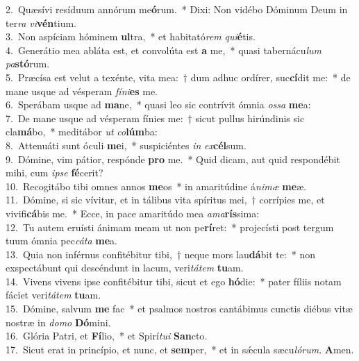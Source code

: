 {2.~}Quæsívi resíduum annórum me\textbf{ó}rum.~* Dixi: Non vidébo Dóminum Deum in ter\textit{ra} \textit{vi}\textbf{vén}tium.\\
{3.~}Non aspíciam hóminem \textbf{ul}tra,~* et habitató\textit{rem} \textit{qui}\textbf{é}tis.\\
{4.~}Generátio mea abláta est, et convolúta est \textbf{a} me,~* quasi tabernácu\textit{lum} \textit{pa}\textbf{stó}rum.\\
{5.~}Præcísa est velut a texénte, vita mea:~† dum adhuc ordírer, suc\textbf{cí}dit me:~* de mane usque ad vésperam \textit{fí}\textit{ni}\textbf{es} me.\\
{6.~}Sperábam usque ad \textbf{ma}ne,~* quasi leo sic contrívit ómnia \textit{os}\textit{sa} \textbf{me}a:\\
{7.~}De mane usque ad vésperam fínies me:~† sicut pullus hirúndinis sic cla\textbf{má}bo,~* meditábor \textit{ut} \textit{co}\textbf{lúm}ba:\\
{8.~}Attenuáti sunt óculi \textbf{me}i,~* suspiciéntes \textit{in} \textit{ex}\textbf{cél}sum.\\
{9.~}Dómine, vim pátior, respónde \textbf{pro} me.~* Quid dicam, aut quid respondébit mihi, cum \textit{i}\textit{pse} \textbf{fé}cerit?\\
{10.~}Recogitábo tibi omnes annos \textbf{me}os~* in amaritúdine á\textit{ni}\textit{mæ} \textbf{me}æ.\\
{11.~}Dómine, si sic vívitur, et in tálibus vita spíritus mei,~† corrípies me, et vivifi\textbf{cá}bis me.~* Ecce, in pace amaritúdo mea \textit{a}\textit{ma}\textbf{rís}sima:\\
{12.~}Tu autem eruísti ánimam meam ut non pe\textbf{rí}ret:~* projecísti post tergum tuum ómnia pec\textit{cá}\textit{ta} \textbf{me}a.\\
{13.~}Quia non inférnus confitébitur tibi,~† neque mors lau\textbf{dá}bit te:~* non exspectábunt qui descéndunt in lacum, veri\textit{tá}\textit{tem} \textbf{tu}am.\\
{14.~}Vivens vivens ipse confitébitur tibi, sicut et ego \textbf{hó}die:~* pater fíliis notam fáciet veri\textit{tá}\textit{tem} \textbf{tu}am.\\
{15.~}Dómine, salvum \textbf{me} fac~* et psalmos nostros cantábimus cunctis diébus vitæ nostræ in \textit{do}\textit{mo} \textbf{Dó}mini.\\
{16.~}Glória Patri, et \textbf{Fí}lio,~* et Spirí\textit{tu}\textit{i} \textbf{San}cto.\\
{17.~}Sicut erat in princípio, et nunc, et \textbf{sem}per,~* et in sǽcula sæcu\textit{ló}\textit{rum}. \textbf{A}men.\\
